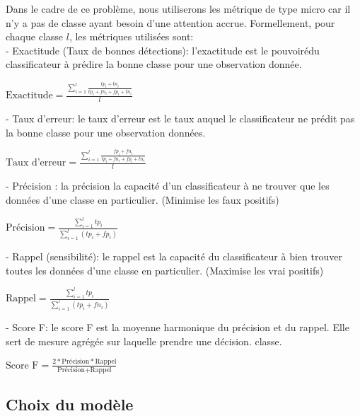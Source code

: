 Dans le cadre de ce problème, nous utiliserons les métrique de type micro car il n'y a pas de classe ayant besoin d'une attention accrue. Formellement, pour chaque classe $l$, les métriques utilisées sont: \\

- Exactitude (Taux de bonnes détections): l'exactitude est le pouvoirédu classificateur à prédire la bonne classe pour une observation donnée.\\
\begin{center}
	$\textrm{Exactitude} = \frac{\sum_{i=1}^{l} \frac{tp_i +tn_i}{tp_i + fn_i + fp_i+ tn_i}}{l}$
\end{center}
	
- Taux d'erreur: le taux d'erreur est le taux auquel le classificateur ne prédit pas la bonne classe pour une observation données.\\ 
\begin{center}
	$\textrm{Taux d'erreur} = \frac{\sum_{i=1}^{l} \frac{fp_i +fn_i}{tp_i + fn_i + fp_i+ tn_i}}{l}$
\end{center}

- Précision : la précision la capacité d'un classificateur à ne trouver que les données d'une classe en particulier. (Minimise les faux positifs) \\
\begin{center}
	$\textrm{Précision} = \frac{\sum_{i=1}^{l} tp_i}{\sum_{i=1}^{l} (tp_i + fp_i)}$
\end{center}

- Rappel (sensibilité): le rappel est la capacité du classificateur à bien trouver toutes les données d'une classe en particulier. (Maximise les vrai positifs)\\
\begin{center}
	$\textrm{Rappel} = \frac{\sum_{i=1}^{l} tp_i}{\sum_{i=1}^{l} (tp_i + fn_i)}$
\end{center}

- Score F: le score F est la moyenne harmonique du précision et du rappel. Elle sert de mesure agrégée sur laquelle prendre une décision. classe.\\	
\begin{center}
	$\textrm{Score F} = \frac{2 * \textrm{Précision} * \textrm{Rappel}}{\textrm{Précision} + \textrm{Rappel}}$ 
\end{center}

\subsection{Choix du modèle}

